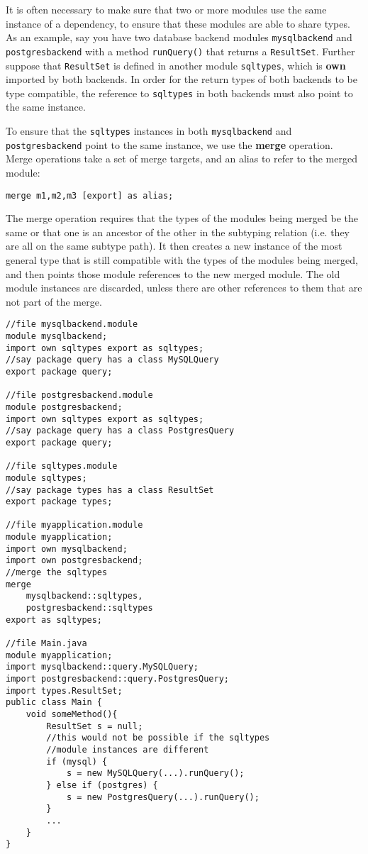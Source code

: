 
It is often necessary to make sure that two or more modules use the same
instance of a dependency, to ensure that these
modules are able to share types. As an example, say you have two database
backend modules {\tt mysqlbackend} and {\tt postgresbackend} with a method
{\tt runQuery()} that returns a \texttt{ResultSet}. Further suppose that {\tt ResultSet} is
defined in another module {\tt sqltypes}, which is \textbf{own} imported by both backends.
In order for the return types of both backends to be type compatible, the
reference to {\tt sqltypes} in both backends must also point to the same
instance.

To ensure that the {\tt sqltypes} instances in both {\tt mysqlbackend}
and {\tt postgresbackend} point to the same instance, we use the 
\textbf{merge} operation. Merge operations take a set of merge targets,
and an alias to refer to the merged module:

\begin{lstlisting}
merge m1,m2,m3 [export] as alias;
\end{lstlisting}

The merge operation requires that the types
of the modules being merged be the same or that one is an ancestor of
the other in the subtyping relation (i.e. they are all on the same subtype path). 
It then creates a new instance
of the most general type that is still compatible with the types of the
modules being merged, and then points those module references to the new 
merged module. The old module instances are discarded, unless there
are other references to them that are not part of the merge.

\begin{lstlisting}[caption=Merge]
//file mysqlbackend.module
module mysqlbackend;
import own sqltypes export as sqltypes;
//say package query has a class MySQLQuery
export package query;

//file postgresbackend.module
module postgresbackend;
import own sqltypes export as sqltypes;
//say package query has a class PostgresQuery
export package query;

//file sqltypes.module
module sqltypes;
//say package types has a class ResultSet
export package types;

//file myapplication.module
module myapplication;
import own mysqlbackend;
import own postgresbackend;
//merge the sqltypes
merge 
	mysqlbackend::sqltypes, 
	postgresbackend::sqltypes 
export as sqltypes;

//file Main.java
module myapplication;
import mysqlbackend::query.MySQLQuery;
import postgresbackend::query.PostgresQuery;
import types.ResultSet;
public class Main {
	void someMethod(){
		ResultSet s = null;
		//this would not be possible if the sqltypes
		//module instances are different
		if (mysql) {
			s = new MySQLQuery(...).runQuery();
		} else if (postgres) {
			s = new PostgresQuery(...).runQuery();
		}
		...
	}
}
\end{lstlisting}


